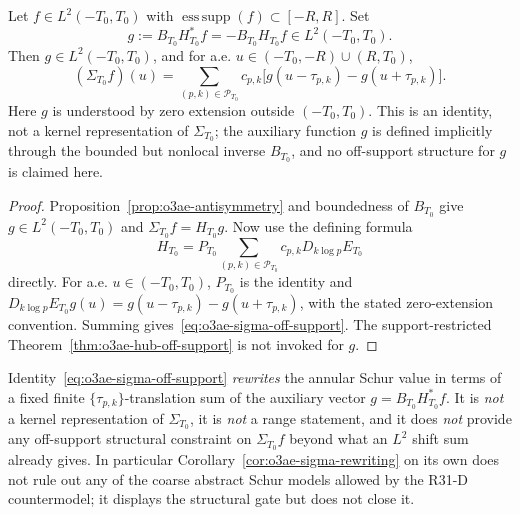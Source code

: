 \begin{corollary}
\label{cor:o3ae-sigma-rewriting}
Let \(f\in L^2(-T_0,T_0)\) with \(\operatorname{ess\,supp}(f)\subset[-R,R]\).
Set
\[
 g:=B_{T_0}H_{T_0}^*f
 =-B_{T_0}H_{T_0}f\in L^2(-T_0,T_0).
\]
Then \(g\in L^2(-T_0,T_0)\), and for a.e.
\(u\in(-T_0,-R)\cup(R,T_0)\),
\[
 \boxed{
 (\Sigma_{T_0}f)(u)
 =\sum_{(p,k)\in\mathcal P_{T_0}}c_{p,k}
 \bigl[g(u-\tau_{p,k})-g(u+\tau_{p,k})\bigr].
 }
\tag{O3AE.3}\label{eq:o3ae-sigma-off-support}
\]
Here \(g\) is understood by zero extension outside \((-T_0,T_0)\).  This is an
identity, not a kernel representation of \(\Sigma_{T_0}\); the auxiliary function
\(g\) is defined implicitly through the bounded but nonlocal inverse \(B_{T_0}\), and
no off-support structure for \(g\) is claimed here.
\end{corollary}

\begin{proof}
Proposition~\ref{prop:o3ae-antisymmetry} and boundedness of \(B_{T_0}\) give
\(g\in L^2(-T_0,T_0)\) and \(\Sigma_{T_0}f=H_{T_0}g\).  Now use the defining formula
\[
 H_{T_0}=P_{T_0}\sum_{(p,k)\in\mathcal P_{T_0}}
 c_{p,k}D_{k\log p}E_{T_0}
\]
directly.  For a.e. \(u\in(-T_0,T_0)\), \(P_{T_0}\) is the identity and
\(D_{k\log p}E_{T_0}g(u)=g(u-\tau_{p,k})-g(u+\tau_{p,k})\), with the stated zero-extension convention.  Summing gives~\eqref{eq:o3ae-sigma-off-support}.  The support-restricted Theorem~\ref{thm:o3ae-hub-off-support} is not invoked for \(g\).
\end{proof}

\begin{remark}
\label{rem:o3ae-scope-sigma}
Identity~\eqref{eq:o3ae-sigma-off-support} \emph{rewrites} the annular Schur
value in terms of a fixed finite \(\{\tau_{p,k}\}\)-translation sum of the
auxiliary vector \(g=B_{T_0}H_{T_0}^*f\).  It is
\emph{not} a kernel representation of \(\Sigma_{T_0}\), it is
\emph{not} a range statement, and it does \emph{not} provide any off-support
structural constraint on \(\Sigma_{T_0}f\) beyond what an \(L^2\) shift sum
already gives.  In particular Corollary~\ref{cor:o3ae-sigma-rewriting} on its
own does not rule out any of the coarse abstract Schur models allowed by the
R31-D countermodel; it displays the structural gate but does not close it.
\end{remark}

